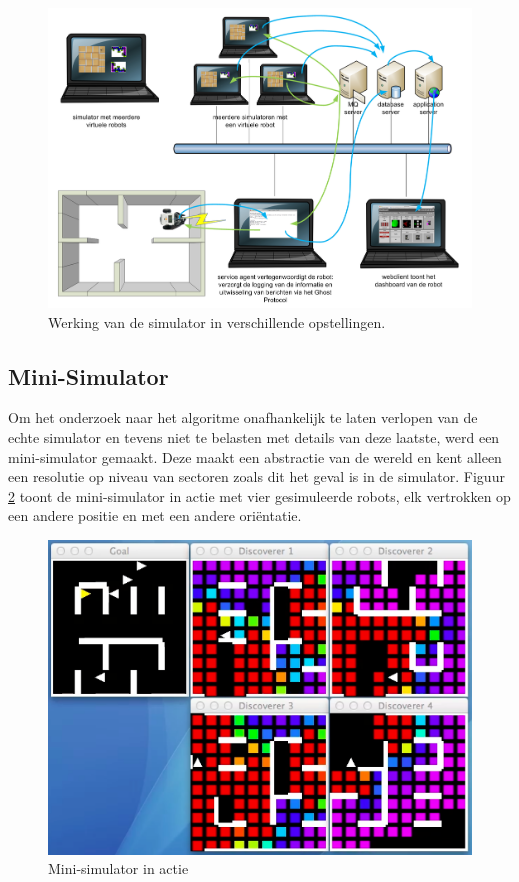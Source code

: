 \documentclass[12pt,a4paper]{report}
\begin{document}
\begin{figure}[htbp]
  \centering
  \includegraphics[width=200mm, angle=90]{resources/simulator-modi.png}
  \caption{Werking van de simulator in verschillende opstellingen.}
  \label{fig:simulator-modi}
\end{figure}

\subsection{Mini-Simulator}
\label{sect:mini-simulator}
Om het onderzoek naar het algoritme onafhankelijk te laten verlopen van de echte simulator en tevens niet te belasten met details van deze laatste, werd een mini-simulator gemaakt. Deze maakt een abstractie van de wereld en kent alleen een resolutie op niveau van sectoren zoals dit het geval is in de simulator. Figuur \ref{fig:mini-simulator} toont de mini-simulator in actie met vier gesimuleerde robots, elk vertrokken op een andere positie en met een andere ori\"entatie.

\begin{figure}[htbp]
  \centering
  \includegraphics[width=120mm]{resources/mini-simulator.png}
  \caption{Mini-simulator in actie}
  \label{fig:mini-simulator}
\end{figure}
\end{document}
